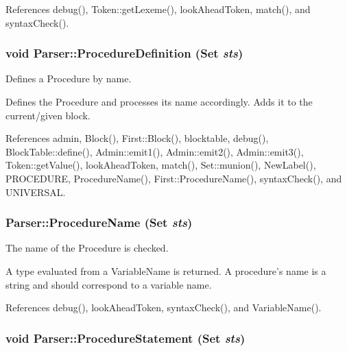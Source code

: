 References debug(), Token::getLexeme(), lookAheadToken, match(), and syntaxCheck().

\hypertarget{classParser_ae1399c8e85c6b366db055dd12914b0da}{
\subsubsection[{ProcedureDefinition}]{\setlength{\rightskip}{0pt plus 5cm}void Parser::ProcedureDefinition ({\bf Set} {\em sts})}}
\label{classParser_ae1399c8e85c6b366db055dd12914b0da}


Defines a Procedure by name. 

Defines the Procedure and processes its name accordingly. Adds it to the current/given block. 

References admin, Block(), First::Block(), blocktable, debug(), BlockTable::define(), Admin::emit1(), Admin::emit2(), Admin::emit3(), Token::getValue(), lookAheadToken, match(), Set::munion(), NewLabel(), PROCEDURE, ProcedureName(), First::ProcedureName(), syntaxCheck(), and UNIVERSAL.

\hypertarget{classParser_a40cd3f4f71c1e5ab0d484679002e55bd}{
\subsubsection[{ProcedureName}]{ Parser::ProcedureName ({\bf Set} {\em sts})}}
\label{classParser_a40cd3f4f71c1e5ab0d484679002e55bd}


The name of the Procedure is checked. 

A type evaluated from a VariableName is returned. A procedure's name is a string and should correspond to a variable name. 

References debug(), lookAheadToken, syntaxCheck(), and VariableName().

\hypertarget{classParser_a7a6c6b63d49340ff06c453ce8954eeff}{
\subsubsection[{ProcedureStatement}]{\setlength{\rightskip}{0pt plus 5cm}void Parser::ProcedureStatement ({\bf Set} {\em sts})}}
\label{classParser_a7a6c6b63d49340ff06c453ce8954eeff}


